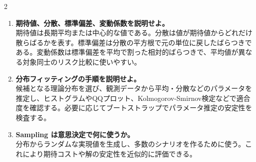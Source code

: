 \begin{multicols}{2}
\begin{enumerate}
\item \textbf{期待値、分散、標準偏差、変動係数を説明せよ。}\\
期待値は長期平均または中心的な値である。分散は値が期待値からどれだけ散らばるかを表す。標準偏差は分散の平方根で元の単位に戻したばらつきである。変動係数は標準偏差を平均で割った相対的ばらつきで、平均値が異なる対象同士のリスク比較に使いやすい。
\item \textbf{分布フィッティングの手順を説明せよ。}\\
候補となる理論分布を選び、観測データから平均・分散などのパラメータを推定し、ヒストグラムやQQプロット、Kolmogorov-Smirnov検定などで適合度を確認する。必要に応じてブートストラップでパラメータ推定の安定性を検査する。
\item \textbf{Sampling は意思決定で何に使うか。}\\
分布からランダムな実現値を生成し、多数のシナリオを作るために使う。これにより期待コストや解の安定性を近似的に評価できる。
\end{enumerate}

\end{multicols}

\clearpage



\vspace{1.5mm}

